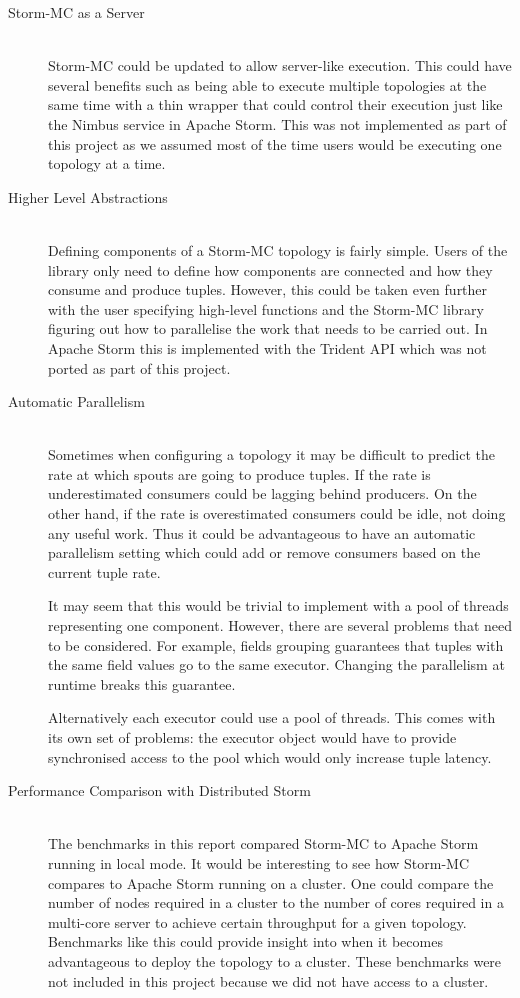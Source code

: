 \documentclass[bsc,deptreport,twoside,singlespacing,normalheadings,parskip]{infthesis}\usepackage[]{graphicx}\usepackage[]{color}
\begin{document}
\begin{description}
	\item[Storm-MC as a Server] \hfill \\
	Storm-MC could be updated to allow server-like execution. This could have several benefits such as being able to execute multiple topologies at the same time with a thin wrapper that could control their execution just like the Nimbus service in Apache Storm. This was not implemented as part of this project as we assumed most of the time users would be executing one topology at a time.
	\item[Higher Level Abstractions] \hfill \\
	Defining components of a Storm-MC topology is fairly simple. Users of the library only need to define how components are connected and how they consume and produce tuples. However, this could be taken even further with the user specifying high-level functions and the Storm-MC library figuring out how to parallelise the work that needs to be carried out. In Apache Storm this is implemented with the Trident API which was not ported as part of this project.
	\item[Automatic Parallelism] \hfill \\
	Sometimes when configuring a topology it may be difficult to predict the rate at which spouts are going to produce tuples. If the rate is underestimated consumers could be lagging behind producers. On the other hand, if the rate is overestimated consumers could be idle, not doing any useful work. Thus it could be advantageous to have an automatic parallelism setting which could add or remove consumers based on the current tuple rate.
	
	It may seem that this would be trivial to implement with a pool of threads representing one component. However, there are several problems that need to be considered. For example, fields grouping guarantees that tuples with the same field values go to the same executor. Changing the parallelism at runtime breaks this guarantee.
	
	Alternatively each executor could use a pool of threads. This comes with its own set of problems: the executor object would have to provide synchronised access to the pool which would only increase tuple latency.
	\item[Performance Comparison with Distributed Storm] \hfill \\
	The benchmarks in this report compared Storm-MC to Apache Storm running in local mode. It would be interesting to see how Storm-MC compares to Apache Storm running on a cluster. One could compare the number of nodes required in a cluster to the number of cores required in a multi-core server to achieve certain throughput for a given topology. Benchmarks like this could provide insight into when it becomes advantageous to deploy the topology to a cluster. These benchmarks were not included in this project because we did not have access to a cluster.
\end{description}
\end{document}

